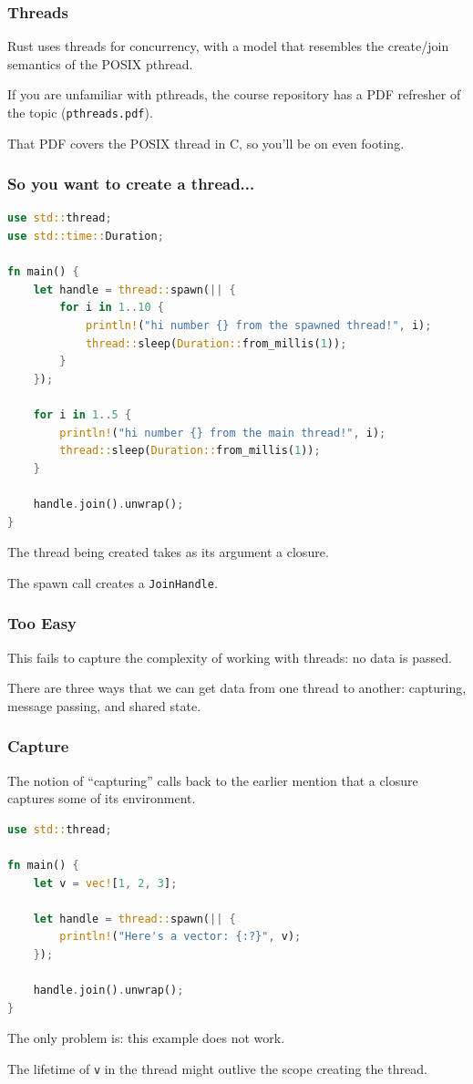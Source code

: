 \begin{frame}
\frametitle{Threads}

Rust uses threads for concurrency, with a model that resembles the create/join semantics of the POSIX pthread. 

If you are unfamiliar with pthreads, the course repository has a PDF refresher of the topic (\texttt{pthreads.pdf}).

That PDF covers the POSIX thread in C, so you'll be on even footing.

\end{frame}


\begin{frame}[fragile]
\frametitle{So you want to create a thread...}

\begin{lstlisting}[language=Rust]
use std::thread;
use std::time::Duration;

fn main() {
    let handle = thread::spawn(|| {
        for i in 1..10 {
            println!("hi number {} from the spawned thread!", i);
            thread::sleep(Duration::from_millis(1));
        }
    });

    for i in 1..5 {
        println!("hi number {} from the main thread!", i);
        thread::sleep(Duration::from_millis(1));
    }

    handle.join().unwrap();
}
\end{lstlisting}

The thread being created takes as its argument a \alert{closure}.


The spawn call creates a \texttt{JoinHandle}.
\end{frame}


\begin{frame}
\frametitle{Too Easy}

This fails to capture the complexity of working with threads: no data is passed.

There are three ways that we can get data from one thread to another: capturing, message passing, and shared state.

\end{frame}


\begin{frame}[fragile]
\frametitle{Capture}

The notion of ``capturing'' calls back to the earlier mention that a closure captures some of its environment. 

\begin{lstlisting}[language=Rust]
use std::thread;

fn main() {
    let v = vec![1, 2, 3];

    let handle = thread::spawn(|| {
        println!("Here's a vector: {:?}", v);
    });

    handle.join().unwrap();
}
\end{lstlisting}

The only problem is: this example does not work.

The lifetime of \texttt{v} in the thread might outlive the scope creating the thread.

\end{frame}


